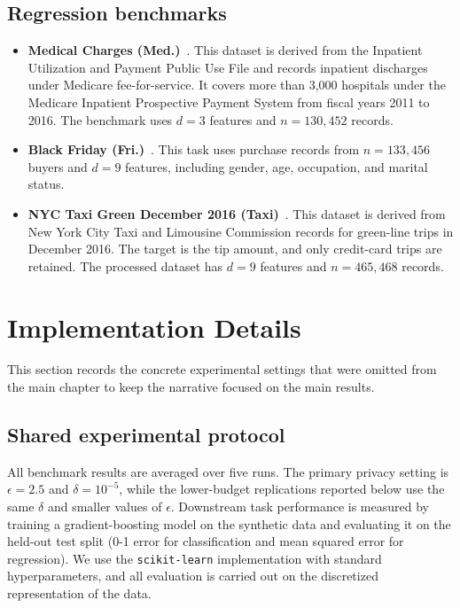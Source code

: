 \subsection{Regression benchmarks}
\begin{itemize}
  \item \textbf{Medical Charges (Med.)}~\citep{grinsztajn2022tree}. This dataset is derived from the Inpatient Utilization and Payment Public Use File and records inpatient discharges under Medicare fee-for-service. It covers more than 3,000 hospitals under the Medicare Inpatient Prospective Payment System from fiscal years 2011 to 2016. The benchmark uses \(d=3\) features and \(n=130{,}452\) records.
  \item \textbf{Black Friday (Fri.)}~\citep{grinsztajn2022tree}. This task uses purchase records from \(n=133{,}456\) buyers and \(d=9\) features, including gender, age, occupation, and marital status.
  \item \textbf{NYC Taxi Green December 2016 (Taxi)}~\citep{grinsztajn2022tree}. This dataset is derived from New York City Taxi and Limousine Commission records for green-line trips in December 2016. The target is the tip amount, and only credit-card trips are retained. The processed dataset has \(d=9\) features and \(n=465{,}468\) records.
\end{itemize}

\section{Implementation Details}
\label{app:privpgd-implementation}

This section records the concrete experimental settings that were omitted from the main chapter to keep the narrative focused on the main results.

\subsection{Shared experimental protocol}
All benchmark results are averaged over five runs. The primary privacy setting is \(\epsilon = 2.5\) and \(\delta = 10^{-5}\), while the lower-budget replications reported below use the same \(\delta\) and smaller values of \(\epsilon\). Downstream task performance is measured by training a gradient-boosting model on the synthetic data and evaluating it on the held-out test split (0-1 error for classification and mean squared error for regression). We use the \texttt{scikit-learn} implementation \citep{sklearn_api} with standard hyperparameters, and all evaluation is carried out on the discretized representation of the data.

